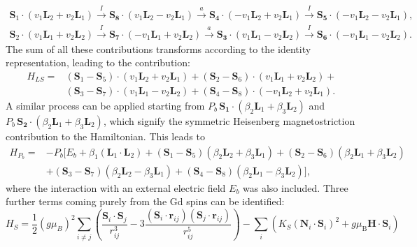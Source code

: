 \begin{align}
	\mathbf{S}_1\cdot(v_1 \mathbf{L}_2 + v_2 \mathbf{L}_1) \xrightarrow{I} \mathbf{S_8}\cdot(v_1 \mathbf{L}_2 - v_2 \mathbf{L}_1) \xrightarrow{a} \mathbf{S_4} \cdot (- v_1 \mathbf{L}_2 + v_2 \mathbf{L}_1) \xrightarrow{I} \mathbf{S_5} \cdot (-v_1 \mathbf{L}_2 - v_2 \mathbf{L}_1), \nonumber\\
	\mathbf{S}_2\cdot(v_1 \mathbf{L}_1 + v_2 \mathbf{L}_2) \xrightarrow{I} \mathbf{S_7}\cdot(-v_1 \mathbf{L}_1 + v_2 \mathbf{L}_2) \xrightarrow{a} \mathbf{S_3} \cdot (v_1 \mathbf{L}_1 - v_2 \mathbf{L}_2) \xrightarrow{I} \mathbf{S_6} \cdot (-v_1 \mathbf{L}_1 - v_2 \mathbf{L}_2).
\end{align}
The sum of all these contributions transforms according to the identity representation, leading to the contribution:
\begin{align}
    H_{LS} =& (\mathbf{S}_1 - \mathbf{S}_5) \cdot (v_1 \mathbf{L}_2 + v_2 \mathbf{L}_1) + (\mathbf{S}_2 - \mathbf{S}_6) \cdot (v_1 \mathbf{L}_1 + v_2 \mathbf{L}_2) + \nonumber \\ &(\mathbf{S}_3 - \mathbf{S}_7) \cdot (v_1 \mathbf{L}_1 - v_2 \mathbf{L}_2) + (\mathbf{S}_4 - \mathbf{S}_8) \cdot (-v_1 \mathbf{L}_2 + v_2 \mathbf{L}_1).
\end{align}
A similar process can be applied starting from $P_b \, \mathbf{S_1}\cdot(\beta_2 \mathbf{L}_1 + \beta_3 \mathbf{L}_2)$ and $P_b\, \mathbf{S_2}\cdot(\beta_2 \mathbf{L}_1 + \beta_3 \mathbf{L}_2)$, which signify the symmetric Heisenberg magnetostriction contribution to the Hamiltonian. This leads to
\begin{align}
	H_{P_b}=&-P_b[E_b + \beta_1 (\mathbf{L}_1\cdot \mathbf{L}_2)+
    (\mathbf{S}_1-\mathbf{S}_5)(\beta_2 \mathbf{L}_2 + \beta_3 \mathbf{L}_1) +
    (\mathbf{S}_2-\mathbf{S}_6)(\beta_2 \mathbf{L}_1 + \beta_3 \mathbf{L}_2) \nonumber\\ 
    &+(\mathbf{S}_3-\mathbf{S}_7)(\beta_2 \mathbf{L}_2 - \beta_3 \mathbf{L}_1) +
    (\mathbf{S}_4-\mathbf{S}_8)(\beta_2 \mathbf{L}_1 - \beta_3 \mathbf{L}_2)],
\end{align}
where the interaction with an external electric field $E_b$ was also included. 
Three further terms coming purely from the Gd spins can be identified:
\begin{equation}
     H_S=\frac{1}{2}(g \mu_B)^2\sum_{i\neq j}\left(\frac{\mathbf{S}_i\cdot \mathbf{S}_j}{r_{ij}^3}-3\frac{(\mathbf{S}_i\cdot \mathbf{r}_{ij})(\mathbf{S}_j\cdot \mathbf{r}_{ij})}{r_{ij}^5}\right) - \sum_i\left( K_S(\mathbf{N}_i\cdot \mathbf{S}_i)^2 + g\mu_\mathrm{B} \mathbf{H} \cdot \mathbf{S}_i\right) 
\end{equation}
